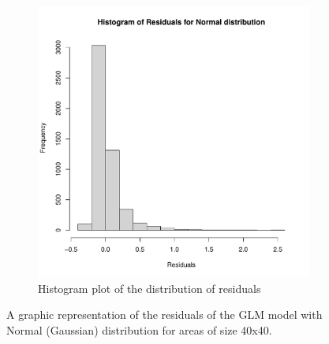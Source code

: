 \documentclass[12pt,a4paper,twoside]{article}
\begin{document}
\begin{figure}[!ht]
\begin{subfigure}{.45\textwidth}
        \includegraphics[width=\linewidth]{img/Normal_distribution_histogram_40x40.pdf}
        \caption{Histogram plot of the distribution of residuals}
        \label{fig:gaussianhist40}
    \end{subfigure}
    \caption{A graphic representation of the residuals of the GLM model with Normal (Gaussian)
    distribution for areas of size 40x40.}
    \label{fig:gaussianfig40}
\end{figure}
\end{document}
